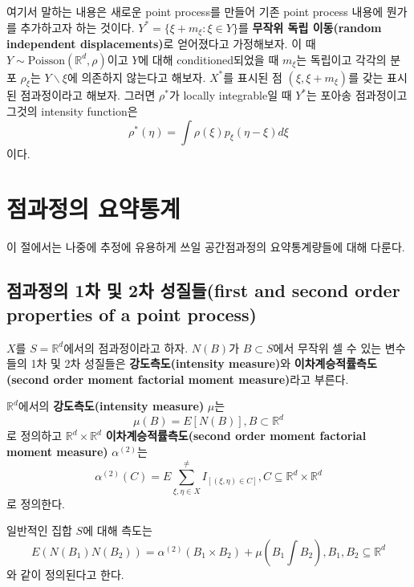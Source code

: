 \documentclass[b5paper,]{scrbook}
\theoremstyle{plain}
\theoremstyle{definition}
\numberwithin{equation}{section}
\let\BeginKnitrBlock\begin \let\EndKnitrBlock\end
\begin{document}
여기서 말하는 내용은 새로운 point process를 만들어 기존 point process 내용에 뭔가를 추가하고자 하는 것이다. \(Y^{*}=\{\xi + m_{\xi}: \xi \in Y\}\)를 \textbf{무작위 독립 이동(random independent displacements)}로 얻어졌다고 가정해보자. 이 때 \(Y\sim \text{Poisson}(\mathbb{R}^{d}, \rho)\)이고 \(Y\)에 대해 conditioned되었을 때 \(m_{\xi}\)는 독립이고 각각의 분포 \(\rho_{\xi}\)는 \(Y\backslash\xi\)에 의존하지 않는다고 해보자. \(X^{*}\)를 표시된 점 \((\xi, \xi+m_{\xi})\)를 갖는 표시된 점과정이라고 해보자. 그러면 \(\rho^{*}\)가 locally integrable일 때 \(Y^{*}\)는 포아송 점과정이고 그것의 intensity function은
\[\rho^{*}(\eta)=\int\rho(\xi)p_{\xi}(\eta-\xi)d\xi\]
이다.

\hypertarget{summaryPP}{%
\chapter{점과정의 요약통계}\label{summaryPP}}

이 절에서는 나중에 추정에 유용하게 쓰일 공간점과정의 요약통계량들에 대해 다룬다.

\hypertarget{-1--2-first-and-second-order-properties-of-a-point-process}{%
\section{점과정의 1차 및 2차 성질들(first and second order properties of a point process)}\label{-1--2-first-and-second-order-properties-of-a-point-process}}

\(X\)를 \(S=\mathbb{R}^{d}\)에서의 점과정이라고 하자. \(N(B)\)가 \(B\subset S\)에서 무작위 셀 수 있는 변수들의 1차 및 2차 성질들은 \textbf{강도측도(intensity measure)}와 \textbf{이차계승적률측도(second order moment factorial moment measure)}라고 부른다.

\BeginKnitrBlock{definition}[강도측도]
\protect\hypertarget{def:unnamed-chunk-414}{}{\label{def:unnamed-chunk-414} {} }\(\mathbb{R}^{d}\)에서의 \textbf{강도측도(intensity measure)} \(\mu\)는
\[\mu(B)=E[N(B)], B\subset \mathbb{R}^{d}\]
로 정의하고 \(\mathbb{R}^{d}\times \mathbb{R}^{d}\) \textbf{이차계승적률측도(second order moment factorial moment measure)} \(\alpha^{(2)}\)는
\[\alpha^{(2)}(C)=E \sum_{\xi, \eta \in X}^{\neq} I_{[(\xi, \eta)\in C]}, C\subseteq \mathbb{R}^{d}\times \mathbb{R}^{d}\]
로 정의한다.
\EndKnitrBlock{definition}

일반적인 집합 \(S\)에 대해 측도는
\[E(N(B_{1})N(B_{2}))=\alpha^{(2)}(B_{1}\times B_{2}) + \mu (B_{1} \int B_{2}), B_{1}, B_{2}\subseteq \mathbb{R}^{d}\]
와 같이 정의된다고 한다.
\end{document}
